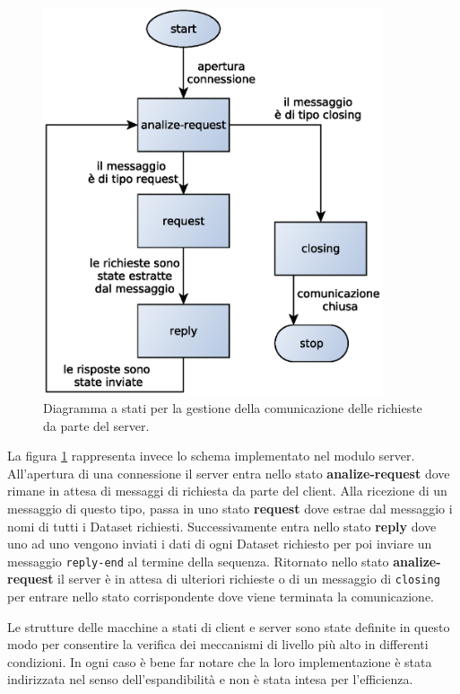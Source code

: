 \begin{figure}
\begin{center}
\includegraphics[width=10cm]{Immagini/StateMachineServer}
\caption{Diagramma a stati per la gestione della comunicazione delle richieste da parte del server.\label{f:stateserver}} 
\end{center} 
\end{figure}

La figura \ref{f:stateserver} rappresenta invece lo schema implementato nel modulo server. All'apertura di una connessione il server entra nello stato \textbf{analize-request} dove rimane in attesa di messaggi di richiesta da parte del client. Alla ricezione di un messaggio di questo tipo, passa in uno stato \textbf{request} dove estrae dal messaggio i nomi di tutti i Dataset richiesti. Successivamente entra nello stato \textbf{reply} dove uno ad uno vengono inviati i dati di ogni Dataset richiesto per poi inviare un messaggio \texttt{reply-end} al termine della sequenza. Ritornato nello stato \textbf{analize-request} il server \`e in attesa di ulteriori richieste o di un messaggio di \texttt{closing} per entrare nello stato corrispondente dove viene terminata la comunicazione.

Le strutture delle macchine a stati di client e server sono state definite in questo modo per consentire la verifica dei meccanismi di livello pi\`u alto in differenti condizioni. In ogni caso \`e bene far notare che la loro implementazione \`e stata indirizzata nel senso dell'espandibilit\`a e non \`e stata intesa per l'efficienza.

